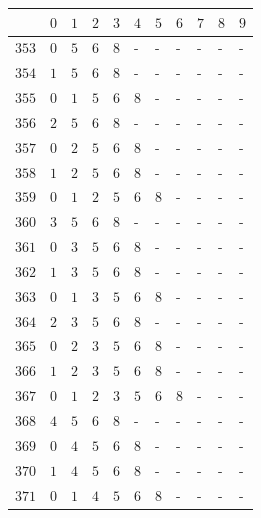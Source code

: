 \begin{appendices}
\begin{table}[H]
  	\centering
  	\begin{tabular} {|l|l|l|l|l|l|l|l|l|l|l|} \hline
  		\backslashbox{$Num$}{$index$} & $ 0 $ & $ 1 $ & $ 2 $ & $ 3 $ & $ 4 $ & $ 5 $ & $ 6 $ & $ 7 $ & $ 8 $ & $ 9 $ \\ \hline
  		$ 353 $ & $ 0 $ &$ 5 $ &$ 6 $ &$ 8 $ & - &  - &  - &  - &  - &  -   \\ \hline
  		$ 354 $ & $ 1 $ &$ 5 $ &$ 6 $ &$ 8 $ & - &  - &  - &  - &  - &  -   \\ \hline
  		$ 355 $ & $ 0 $ &$ 1 $ &$ 5 $ &$ 6 $ &$ 8 $ & - &  - &  - &  - &  -   \\ \hline
  		$ 356 $ & $ 2 $ &$ 5 $ &$ 6 $ &$ 8 $ & - &  - &  - &  - &  - &  -   \\ \hline
  		$ 357 $ & $ 0 $ &$ 2 $ &$ 5 $ &$ 6 $ &$ 8 $ & - &  - &  - &  - &  -   \\ \hline
  		$ 358 $ & $ 1 $ &$ 2 $ &$ 5 $ &$ 6 $ &$ 8 $ & - &  - &  - &  - &  -   \\ \hline
  		$ 359 $ & $ 0 $ &$ 1 $ &$ 2 $ &$ 5 $ &$ 6 $ &$ 8 $ & - &  - &  - &  -   \\ \hline
  		$ 360 $ & $ 3 $ &$ 5 $ &$ 6 $ &$ 8 $ & - &  - &  - &  - &  - &  -   \\ \hline
  		$ 361 $ & $ 0 $ &$ 3 $ &$ 5 $ &$ 6 $ &$ 8 $ & - &  - &  - &  - &  -   \\ \hline
  		$ 362 $ & $ 1 $ &$ 3 $ &$ 5 $ &$ 6 $ &$ 8 $ & - &  - &  - &  - &  -   \\ \hline
  		$ 363 $ & $ 0 $ &$ 1 $ &$ 3 $ &$ 5 $ &$ 6 $ &$ 8 $ & - &  - &  - &  -   \\ \hline
  		$ 364 $ & $ 2 $ &$ 3 $ &$ 5 $ &$ 6 $ &$ 8 $ & - &  - &  - &  - &  -   \\ \hline
  		$ 365 $ & $ 0 $ &$ 2 $ &$ 3 $ &$ 5 $ &$ 6 $ &$ 8 $ & - &  - &  - &  -   \\ \hline
  		$ 366 $ & $ 1 $ &$ 2 $ &$ 3 $ &$ 5 $ &$ 6 $ &$ 8 $ & - &  - &  - &  -   \\ \hline
  		$ 367 $ & $ 0 $ &$ 1 $ &$ 2 $ &$ 3 $ &$ 5 $ &$ 6 $ &$ 8 $ & - &  - &  -   \\ \hline
  		$ 368 $ & $ 4 $ &$ 5 $ &$ 6 $ &$ 8 $ & - &  - &  - &  - &  - &  -   \\ \hline
  		$ 369 $ & $ 0 $ &$ 4 $ &$ 5 $ &$ 6 $ &$ 8 $ & - &  - &  - &  - &  -   \\ \hline
  		$ 370 $ & $ 1 $ &$ 4 $ &$ 5 $ &$ 6 $ &$ 8 $ & - &  - &  - &  - &  -   \\ \hline
  		$ 371 $ & $ 0 $ &$ 1 $ &$ 4 $ &$ 5 $ &$ 6 $ &$ 8 $ & - &  - &  - &  -   \\ \hline

\end{tabular}
\end{table}
\end{appendices}

